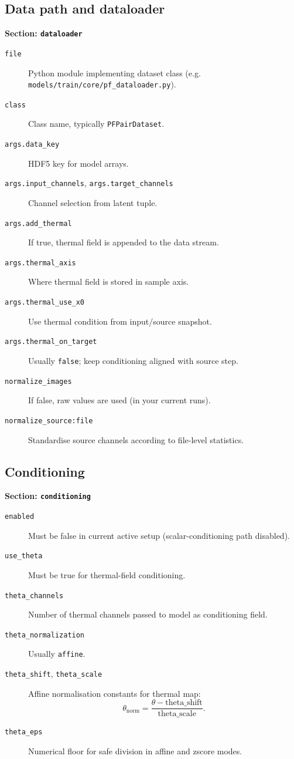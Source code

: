 \documentclass[11pt]{article}
\begin{document}
\subsection{Data path and dataloader}
\textbf{Section: \texttt{dataloader}}
\begin{description}
  \item[\texttt{file}] Python module implementing dataset class (e.g. \texttt{models/train/core/pf\_dataloader.py}).
  \item[\texttt{class}] Class name, typically \texttt{PFPairDataset}.
  \item[\texttt{args.data\_key}] HDF5 key for model arrays.
  \item[\texttt{args.input\_channels}, \texttt{args.target\_channels}] Channel selection from latent tuple.
  \item[\texttt{args.add\_thermal}] If true, thermal field is appended to the data stream.
  \item[\texttt{args.thermal\_axis}] Where thermal field is stored in sample axis.
  \item[\texttt{args.thermal\_use\_x0}] Use thermal condition from input/source snapshot.
  \item[\texttt{args.thermal\_on\_target}] Usually \texttt{false}; keep conditioning aligned with source step.
  \item[\texttt{normalize\_images}] If false, raw values are used (in your current runs).
  \item[\texttt{normalize\_source:file}] Standardise source channels according to file-level statistics.
\end{description}

\subsection{Conditioning}
\textbf{Section: \texttt{conditioning}}
\begin{description}
  \item[\texttt{enabled}] Must be false in current active setup (scalar-conditioning path disabled).
  \item[\texttt{use\_theta}] Must be true for thermal-field conditioning.
  \item[\texttt{theta\_channels}] Number of thermal channels passed to model as conditioning field.
  \item[\texttt{theta\_normalization}] Usually \texttt{affine}.
  \item[\texttt{theta\_shift}, \texttt{theta\_scale}] Affine normalisation constants for thermal map:
  \[
    \theta_{\text{norm}} = \frac{\theta-\text{theta\_shift}}{\text{theta\_scale}}.
  \]
  \item[\texttt{theta\_eps}] Numerical floor for safe division in affine and zscore modes.
\end{description}
\end{document}
